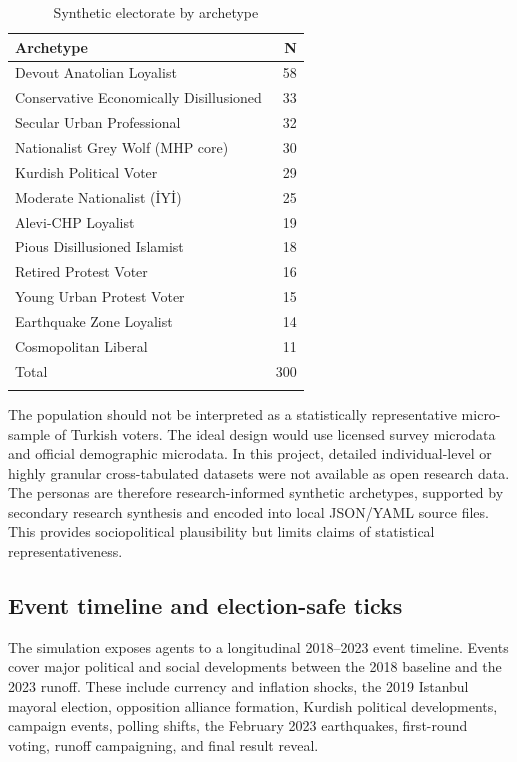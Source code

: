 \documentclass[pdflatex,sn-mathphys-num,iicol]{sn-jnl}
\begin{document}
\begin{table}[t]
\caption{Synthetic electorate by archetype}
\label{tab:electorate}
\centering
\begin{tabular}{@{}p{}r@{}}
\toprule
Archetype & N \\
\midrule
Devout Anatolian Loyalist        & 58 \\
Conservative Economically Disillusioned & 33 \\
Secular Urban Professional       & 32 \\
Nationalist Grey Wolf (MHP core) & 30 \\
Kurdish Political Voter          & 29 \\
Moderate Nationalist (İYİ)       & 25 \\
Alevi-CHP Loyalist               & 19 \\
Pious Disillusioned Islamist     & 18 \\
Retired Protest Voter            & 16 \\
Young Urban Protest Voter        & 15 \\
Earthquake Zone Loyalist         & 14 \\
Cosmopolitan Liberal             & 11 \\
\midrule
Total                            & 300 \\
\botrule
\end{tabular}
\end{table}

The population should not be interpreted as a statistically representative
micro-sample of Turkish voters. The ideal design would use licensed survey
microdata and official demographic microdata. In this project, detailed
individual-level or highly granular cross-tabulated datasets were not available
as open research data. The personas are therefore research-informed synthetic
archetypes, supported by secondary research synthesis and encoded into local
JSON/YAML source files. This provides sociopolitical plausibility but limits
claims of statistical representativeness.

\subsection{Event timeline and election-safe ticks}\label{subsec:timeline}

The simulation exposes agents to a longitudinal 2018--2023 event timeline.
Events cover major political and social developments between the 2018 baseline
and the 2023 runoff. These include currency and inflation shocks, the 2019
Istanbul mayoral election, opposition alliance formation, Kurdish political
developments, campaign events, polling shifts, the February 2023 earthquakes,
first-round voting, runoff campaigning, and final result reveal.
\end{document}
